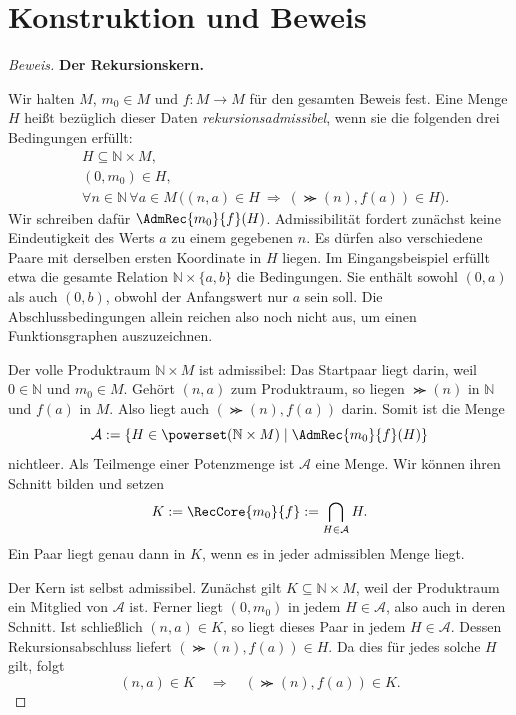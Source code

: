 \section*{Konstruktion und Beweis}
\begin{proof}[Beweis]
\textbf{Der Rekursionskern.}

Wir halten \(M\), \(m_0\in M\) und \(f\colon M\to M\)
für den gesamten Beweis fest. Eine Menge \(H\) heißt bezüglich
dieser Daten \emph{rekursionsadmissibel}, wenn sie die folgenden
drei Bedingungen erfüllt:
\[
  \begin{aligned}
    &H\subseteq\mathbb N\times M,\\
    &(0,m_0)\in H,\\
    &\forall n\in\mathbb N\,\forall a\in M\,
      \bigl((n,a)\in H
        \ \Longrightarrow\ (\Succ(n),f(a))\in H\bigr).
  \end{aligned}
\]
Wir schreiben dafür \(\AdmRec{m_0}{f}(H)\).
Admissibilität fordert zunächst keine Eindeutigkeit des Werts
\(a\) zu einem gegebenen \(n\). Es dürfen also verschiedene
Paare mit derselben ersten Koordinate in \(H\) liegen.
Im Eingangsbeispiel erfüllt etwa die gesamte Relation
\(\mathbb N\times\{a,b\}\) die Bedingungen. Sie enthält sowohl
\((0,a)\) als auch \((0,b)\), obwohl der Anfangswert nur \(a\)
sein soll. Die Abschlussbedingungen allein reichen also noch nicht
aus, um einen Funktionsgraphen auszuzeichnen.

Der volle Produktraum \(\mathbb N\times M\) ist admissibel:
Das Startpaar liegt darin, weil \(0\in\mathbb N\) und
\(m_0\in M\). Gehört \((n,a)\) zum Produktraum, so liegen
\(\Succ(n)\) in \(\mathbb N\) und \(f(a)\) in \(M\).
Also liegt auch \((\Succ(n),f(a))\) darin.
Somit ist die Menge
\[
  \mathcal A
    :=\{H\in\powerset(\mathbb N\times M)
         \mid \AdmRec{m_0}{f}(H)\}
\]
nichtleer. Als Teilmenge einer Potenzmenge ist \(\mathcal A\)
eine Menge. Wir können ihren Schnitt bilden und setzen
\[
  K:=\RecCore{m_0}{f}:=\bigcap_{H\in\mathcal A}H.
\]
Ein Paar liegt genau dann in \(K\), wenn es in jeder admissiblen
Menge liegt.

Der Kern ist selbst admissibel. Zunächst gilt
\(K\subseteq\mathbb N\times M\), weil der Produktraum ein
Mitglied von \(\mathcal A\) ist. Ferner liegt \((0,m_0)\)
in jedem \(H\in\mathcal A\), also auch in deren Schnitt.
Ist schließlich \((n,a)\in K\), so liegt dieses Paar in jedem
\(H\in\mathcal A\). Dessen Rekursionsabschluss liefert
\((\Succ(n),f(a))\in H\). Da dies für jedes solche \(H\)
gilt, folgt
\[
  (n,a)\in K
  \quad\Longrightarrow\quad
  (\Succ(n),f(a))\in K.
\]


\end{proof}
